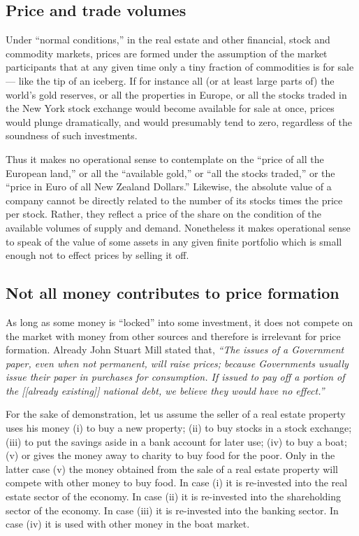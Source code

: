 \documentclass[aps,rmp,preprint,amsfonts,showpacs,showkeys]{revtex4}
\begin{document}
\subsection{Price and trade volumes}
Under ``normal conditions,'' in the real estate and other financial, stock and commodity markets,
prices are formed under the assumption of the market participants that at any given time only a tiny fraction of commodities
is for sale --- like the tip of an iceberg.
If for instance all (or at least large parts of) the world's gold reserves,
or all the properties in Europe, or all the stocks traded in the New York stock exchange
would become available for sale at once, prices would plunge dramatically, and would presumably tend to zero,
regardless of the soundness of such investments.

Thus it makes no operational sense to contemplate on the ``price of all the European land,''
or all the ``available gold,'' or ``all the stocks traded,'' or the ``price in Euro of all New Zealand Dollars.''
Likewise, the absolute value of a company cannot be directly related to the number of its stocks times the price per stock.
Rather, they reflect a price of the share on the condition of the available volumes of supply and demand.
Nonetheless it makes operational sense to speak of the value of some assets in any given finite portfolio which
is small enough not to effect prices by selling it off.


\subsection{Not all money contributes to price formation}

As long as some money is ``locked'' into some investment,
it does not compete on the market with  money from other sources and therefore
is irrelevant for price formation.
Already John Stuart Mill \cite[p.~589]{mill-1844} stated that,
{\em ``The issues of a Government paper, even when not permanent, will raise prices;
because Governments usually issue their paper in purchases for consumption.
If issued to pay off a portion of the [[already existing]] national debt, we believe they would have no effect.''}


For the sake of demonstration, let us assume the seller of a real estate property uses his money
(i)
to buy a new property;
(ii)
to buy stocks in a stock exchange;
(iii)
to put the savings aside in a bank account for later use;
(iv)
to buy a boat;
(v) or
gives the money away to charity to buy food for the poor.
Only in the latter case (v) the money obtained from the sale of a real estate property will compete with other money to buy food.
In case (i) it is re-invested into the real estate sector of the economy.
In case (ii) it is re-invested into the shareholding sector of the economy.
In case (iii) it is re-invested into the banking sector.
In case (iv) it is used with other money in the boat market.
\end{document}

